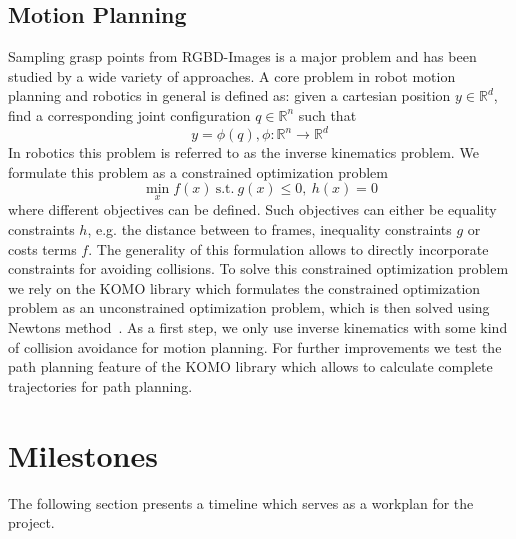\documentclass[a4paper]{article}
\begin{document}
\subsection{Motion Planning}
\label{3_2subsec_motion_planning}
Sampling grasp points from RGBD-Images is a major problem and has been studied by a wide variety of approaches.
A core problem in robot motion planning and robotics in general is defined as: given a cartesian position $y \in \mathbb{R}^d$, find a corresponding joint configuration $q \in \mathbb{R}^n$ such that
\begin{equation}
    y = \phi(q),  \phi : \mathbb{R}^n \rightarrow \mathbb{R}^d
\end{equation}
In robotics this problem is referred to as the inverse kinematics problem.
We formulate this problem as a constrained optimization problem 
\begin{equation}
    \min_x f(x) \ \text{s.t.} \ g(x) \leq 0, \  h(x) = 0
\end{equation}
where different objectives can be defined. 
Such objectives can either be equality constraints $h$, e.g. the distance between to frames, inequality constraints $g$ or costs terms $f$.
The generality of this formulation allows to directly incorporate constraints for avoiding collisions.
To solve this constrained optimization problem we rely on the KOMO library which formulates the constrained optimization problem as an unconstrained optimization problem, which is then solved using Newtons method~\cite{laumond_tutorial_2017}.
As a first step, we only use inverse kinematics with some kind of collision avoidance for motion planning. 
For further improvements we test the path planning feature of the KOMO library which allows to calculate complete trajectories for path planning.


\clearpage
\section{Milestones}
\label{4_sec_milestones}

The following section presents a timeline which serves as a workplan for the project.
\end{document}
